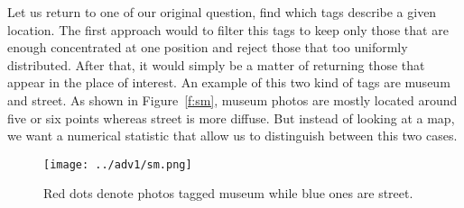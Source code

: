 Let us return to one of our original question, find which tags describe a given
location. The first approach would to filter this  tags to keep
only those that are enough concentrated at one position and reject those that
too uniformly distributed. After that, it would simply be a matter of
returning those that appear in the place of interest. An example of this two
kind of tags are \textsf{museum} and \textsf{street}. As shown in
Figure~\vref{f:sm}, \textsf{museum} photos are mostly located around five or
six points whereas \textsf{street} is more diffuse. But instead of looking at
a map, we want a numerical statistic that allow us to distinguish between this
two cases.

\begin{figure}[hbtp]
	\centering
	\texttt{[image: ../adv1/sm.png]}
	\caption{Red dots denote photos tagged \textsf{museum} while blue ones are
	\textsf{street}.\label{f:sm}}
\end{figure}
